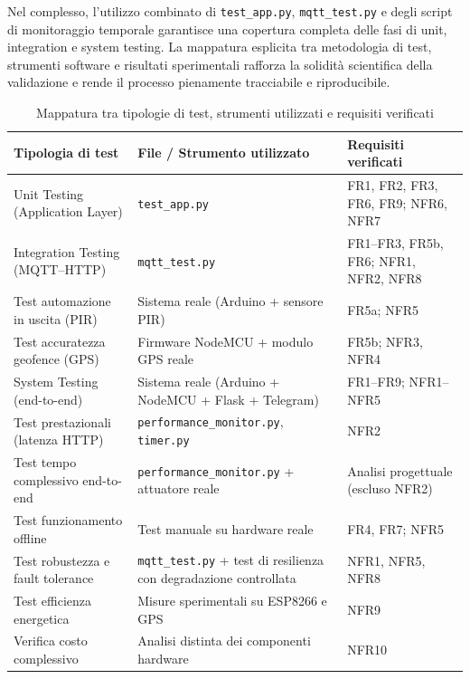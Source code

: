 Nel complesso, l’utilizzo combinato di \texttt{test\_app.py}, \texttt{mqtt\_test.py} e degli script di monitoraggio temporale garantisce una copertura completa delle fasi di unit, integration e system testing. La mappatura esplicita tra metodologia di test, strumenti software e risultati sperimentali rafforza la solidità scientifica della validazione e rende il processo pienamente tracciabile e riproducibile.
\begin{table}[h!]
\centering
\caption{Mappatura tra tipologie di test, strumenti utilizzati e requisiti verificati}
\label{tab:test_file_mapping}
\begin{tabular}{|p{3.6cm}|p{4.4cm}|p{6.0cm}|}
\hline
\textbf{Tipologia di test} & \textbf{File / Strumento utilizzato} & \textbf{Requisiti verificati} \\ \hline

Unit Testing (Application Layer) &
\texttt{test\_app.py} &
FR1, FR2, FR3, FR6, FR9; NFR6, NFR7 \\ \hline

Integration Testing (MQTT--HTTP) &
\texttt{mqtt\_test.py} &
FR1--FR3, FR5b, FR6; NFR1, NFR2, NFR8 \\ \hline

Test automazione in uscita (PIR) &
Sistema reale (Arduino + sensore PIR) &
FR5a; NFR5 \\ \hline

Test accuratezza geofence (GPS) &
Firmware NodeMCU + modulo GPS reale &
FR5b; NFR3, NFR4 \\ \hline

System Testing (end-to-end) &
Sistema reale (Arduino + NodeMCU + Flask + Telegram) &
FR1--FR9; NFR1--NFR5 \\ \hline

Test prestazionali (latenza HTTP) &
\texttt{performance\_monitor.py}, \texttt{timer.py} &
NFR2 \\ \hline

Test tempo complessivo end-to-end &
\texttt{performance\_monitor.py} + attuatore reale &
Analisi progettuale (escluso NFR2) \\ \hline

Test funzionamento offline &
Test manuale su hardware reale &
FR4, FR7; NFR5 \\ \hline

Test robustezza e fault tolerance &
\texttt{mqtt\_test.py} + test di resilienza con degradazione controllata &
NFR1, NFR5, NFR8 \\ \hline

Test efficienza energetica &
Misure sperimentali su ESP8266 e GPS &
NFR9 \\ \hline

Verifica costo complessivo &
Analisi distinta dei componenti hardware &
NFR10 \\ \hline

\end{tabular}
\end{table}



